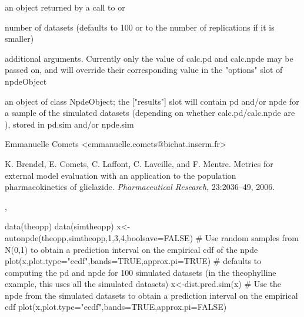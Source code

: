 \documentclass[a4paper]{book}
\begin{document}
%
\begin{Arguments}
\begin{ldescription}
\item[\code{npdeObject}] an object returned by a call to  or 

\item[\code{nsamp}] number of datasets (defaults to 100 or to the number of replications if it is smaller)

\item[\code{...}] additional arguments. Currently only the value of calc.pd and calc.npde may be passed on, and will override their corresponding value in the "options" slot of npdeObject
\end{ldescription}
\end{Arguments}
%
\begin{Value}
an object of class NpdeObject; the ["results"] slot will contain pd and/or npde for a sample of the simulated datasets (depending on whether calc.pd/calc.npde are ), stored in pd.sim and/or npde.sim
\end{Value}
%
\begin{Author}\relax
Emmanuelle Comets <emmanuelle.comets@bichat.inserm.fr>
\end{Author}
%
\begin{References}\relax
K. Brendel, E. Comets, C. Laffont, C. Laveille, and F.
Mentre. Metrics for external model evaluation with an application to the
population pharmacokinetics of gliclazide. \emph{Pharmaceutical Research},
23:2036--49, 2006.
\end{References}
%
\begin{SeeAlso}\relax
{}, 
\end{SeeAlso}
%
\begin{Examples}
\begin{ExampleCode}

data(theopp)
data(simtheopp)
x<-autonpde(theopp,simtheopp,1,3,4,boolsave=FALSE)
# Use random samples from N(0,1) to obtain a prediction interval on the empirical cdf of the npde
plot(x,plot.type="ecdf",bands=TRUE,approx.pi=TRUE)
# defaults to computing the pd and npde for 100 simulated datasets (in the theophylline example, this uses all the simulated datasets)
x<-dist.pred.sim(x)
# Use the npde from the simulated datasets to obtain a prediction interval on the empirical cdf
plot(x,plot.type="ecdf",bands=TRUE,approx.pi=FALSE)
\end{ExampleCode}
\end{Examples}
\end{document}
